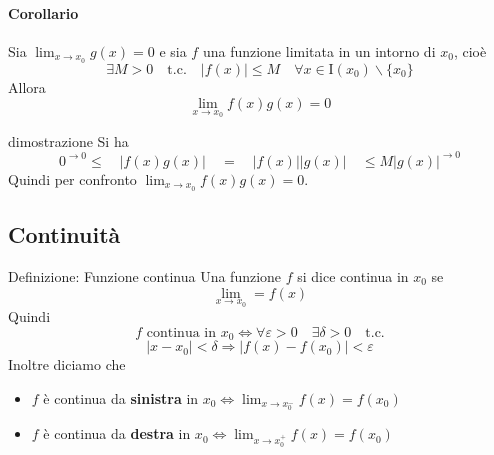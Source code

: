 \documentclass[x11names]{article}
\begin{document}
	\paragraph{Corollario} Sia $\lim_{x \to x_0}g(x) = 0$ e sia $f$ una funzione limitata in un intorno di $x_0$, cioè
	\[
	\exists M > 0 \quad \text{t.c.} \quad |f(x)| \leq M \quad \forall x \in \text{I}(x_0) \backslash \{x_0\}
	\]
	Allora
	\[
	\lim_{x \to x_0}f(x)g(x) = 0
	\]
	
	\begin{es}{dimostrazione}
		Si ha 
		\[
		0^{\to 0} \leq  \quad |f(x)g(x)| \quad = \quad |f(x)| |g(x)|\quad  \leq M|g(x)|^{\to 0}
		\]
		Quindi per confronto $\lim_{x \to x_0}f(x)g(x) = 0$.
	\end{es}
	\subsection{Continuità}
		\begin{center}
		\colorbox{myblue}{\begin{minipage}{5.75in}
				\begin{blues}{Definizione: Funzione continua}
					Una funzione $f$ si dice continua in $x_0$ se 
					\[
					\lim_{x \to x_0} = f(x)
					\]
					Quindi 
					\[
					f \text{ continua in } x_0 \Longleftrightarrow \forall \varepsilon > 0 \quad \exists \delta >0 \quad \text{t.c.}
					\]
					\[
					|x-x_0| < \delta \Longrightarrow |f(x) - f(x_0)| < \varepsilon
					\]
					Inoltre diciamo che
					\begin{itemize}
						\item $f$ è continua da \textbf{sinistra} in $x_0 \Longleftrightarrow \lim_{x \to x_0^-}f(x) = f(x_0)$
						\item $f$ è continua da \textbf{destra} in $x_0 \Longleftrightarrow \lim_{x \to x_0^+}f(x) = f(x_0)$
					\end{itemize}
				\end{blues}
		\end{minipage}}       
	\end{center}
	
\end{document}
